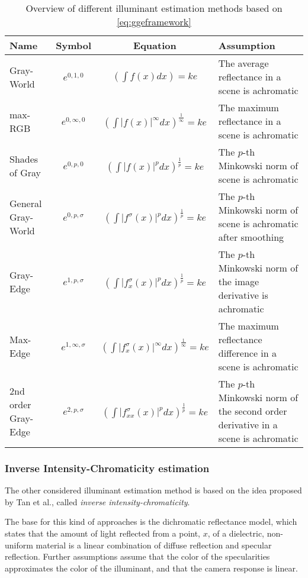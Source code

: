 \begin{table}[h!]
\caption{Overview of different illuminant estimation methods based on \ref{eq:ggeframework}}
\centering
\small
\begin{tabular}{l c c p{4.5cm}} 
\hline\hline 
Name & Symbol & Equation & Assumption \\ [0.5ex]
\hline 
Gray-World & $e^{0, 1, 0}$ & $(\int f(x) dx) = k e$ & The average reflectance in a scene is achromatic \\
max-RGB & $e^{0, \infty, 0}$ & $(\int |f(x)|^{\infty} dx)^{\frac{1}{\infty}} = k e$ & The maximum reflectance in a scene is achromatic \\
Shades of Gray & $e^{0, p, 0}$ & $(\int |f(x)|^{p} dx)^{\frac{1}{p}} = k e$ & The $p$-th Minkowski norm of scene is achromatic \\
General Gray-World & $e^{0, p, \sigma}$ & $(\int |f^{\sigma}(x)|^{p} dx)^{\frac{1}{p}} = k e$ & The $p$-th Minkowski norm of scene is achromatic after smoothing\\
Gray-Edge & $e^{1, p, \sigma}$ & $(\int |f^{\sigma}_{x}(x)|^{p} dx)^{\frac{1}{p}} = k e$ & The $p$-th Minkowski norm of the image derivative is achromatic\\
Max-Edge & $e^{1, \infty, \sigma}$ & $(\int |f^{\sigma}_{x}(x)|^{\infty} dx)^{\frac{1}{\infty}} = k e$ & The maximum reflectance difference in a scene is achromatic\\
2nd order Gray-Edge & $e^{2, p, \sigma}$ & $(\int |f^{\sigma}_{xx}(x)|^{p} dx)^{\frac{1}{p}} = k e$ & The $p$-th Minkowski norm of the second order derivative in a scene is achromatic\\ [1ex]
\hline
\end{tabular}
\label{table:ggemethods}
\end{table}

\subsubsection{Inverse Intensity-Chromaticity estimation}

The other considered illuminant estimation method is based on the idea proposed by Tan et al.\cite{tan2004color}, called \emph{inverse intensity-chromaticity}.

The base for this kind of approaches is the dichromatic reflectance model\cite{gholap2008illuminant}, which states that the amount of light reflected from a point, $x$, of a dielectric, non-uniform material is a linear combination of diffuse reflection and specular reflection. Further assumptions assume that the color of the specularities approximates the color of the illuminant, and that the camera response is linear.

